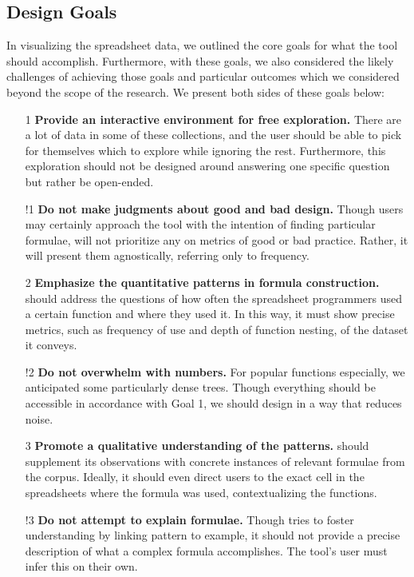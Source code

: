 \documentclass[conference]{IEEEtran}
\begin{document}
	\subsection{Design Goals} \label{goals} In visualizing the spreadsheet data, we outlined the
	core goals for what the tool should accomplish. Furthermore, with these goals,
	we also considered the likely challenges of achieving those goals and
	particular outcomes which we considered beyond the scope of the research. We
	present both sides of these goals below:
	
	\begin{itemize}
		
		\item [1] \textbf{Provide an interactive environment for free exploration.}
		There are a lot of data in some of these collections, and the user should be
		able to pick for themselves which to explore while ignoring the rest. Furthermore,
		this exploration should not be designed around answering one specific question
		but rather be open-ended.
		
		\item [!1] \textbf{Do not make judgments about good and bad design.} Though
		users may certainly approach the tool with the intention of finding particular
		formulae, \toolname will not prioritize any on metrics of good or bad
		practice. Rather, it will present them agnostically, referring only to
		frequency.
		
		\item [2] \textbf{Emphasize the quantitative patterns in formula
			construction.} \toolname should address the questions of how often the
		spreadsheet programmers used a certain function and where they used it. In
		this way, it must show precise metrics, such as frequency of use and depth of
		function nesting, of the dataset it conveys.
		
		\item [!2] \textbf{Do not overwhelm with numbers.} For popular functions
		especially, we anticipated some particularly dense trees. Though
		everything should be accessible in accordance with Goal 1, we should design in
		a way that reduces noise.
		
		\item [3] \textbf{Promote a qualitative understanding of the patterns.}
		\toolname should supplement its observations with concrete instances of
		relevant formulae from the corpus. Ideally, it should even direct users to the
		exact cell in the spreadsheets where the formula was used, contextualizing the
		functions.
		
		\item [!3] \textbf{Do not attempt to explain formulae.} Though \toolname tries
		to foster understanding by linking pattern to example, it should not provide
		a precise description of what a complex formula accomplishes. The tool's user
		must infer this on their own.
		
	\end{itemize}
	
\end{document}
